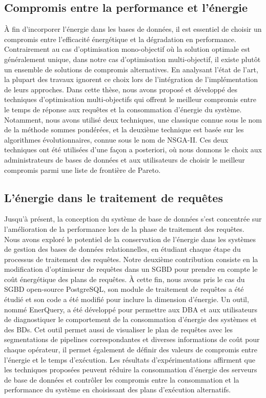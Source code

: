 \subsection{Compromis entre la performance et l'énergie}
À fin d'incorporer l'énergie dans les bases de données, il est essentiel de choisir un compromis entre l'efficacité énergétique et la dégradation en performance. Contrairement au cas d'optimisation mono-objectif où la solution optimale est généralement unique, dans notre cas d'optimisation multi-objectif, il existe plutôt un ensemble de solutions de compromis alternatives. En analysant l'état de l'art, la plupart des travaux ignorent ce choix lors de l'intégration de l'implémentation de leurs approches.
Dans cette thèse, nous avons proposé et développé des techniques d'optimisation multi-objectifs qui offrent le meilleur compromis entre le temps de réponse aux requêtes et la consommation d'énergie du système. Notamment, nous avons utilisé deux techniques, une classique connue sous le nom de la méthode sommes pondérées, et la deuxième technique est basée sur les algorithmes évolutionnaires, connue sous le nom de NSGA-II. Ces deux techniques ont été utilisées d'une façon a posteriori, où nous donnons le choix aux administrateurs de bases de données et aux utilisateurs de choisir le meilleur compromis parmi une liste de frontière de Pareto.
 
\subsection{L'énergie dans le traitement de requêtes}
Jusqu'à présent, la conception du système de base de données s'est concentrée sur l'amélioration de la performance lors de la phase de traitement des requêtes. Nous avons exploré le potentiel de la conservation de l'énergie dans les systèmes de gestion des bases de données relationnelles, en étudiant chaque étape du processus de traitement des requêtes. Notre deuxième contribution consiste en la modification d'optimiseur de requêtes dans un SGBD pour prendre en compte le coût énergétique des plans de requêtes. À cette fin, nous avons pris le cas du SGBD open-source PostgreSQL, son module de traitement de requêtes a été étudié et son code a été modifié pour inclure la dimension d'énergie. Un outil, nommé EnerQuery, a été développé pour permettre aux DBA et aux utilisateurs de diagnostiquer le comportement de la consommation d'énergie des systèmes et des BDs. Cet outil permet aussi de visualiser le plan de requêtes avec les segmentations de pipelines correspondantes et diverses informations de coût pour chaque opérateur, il permet également de définir des valeurs de compromis entre l'énergie et le temps d'exécution. Les résultats d'expérimentations affirment que les techniques proposées peuvent réduire la consommation d'énergie des serveurs de base de données et contrôler les compromis entre la consommation et la performance du système en choisissant des plans d'exécution alternatifs.

